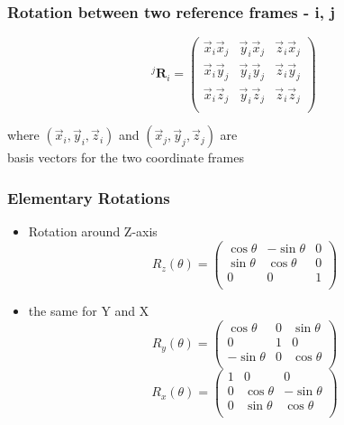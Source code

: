 \documentclass[10pt]{beamer}
\begin{document}
\begin{frame}
  \frametitle{Rotation between two reference frames - i, j}
  \[
    ^{j}\mathbf{R}_i = \left(
      \begin{array}{ccc}
        \vec{x}_i \vec{x}_j & \vec{y}_i \vec{x}_j & \vec{z}_i \vec{x}_j \\
        \vec{x}_i \vec{y}_j & \vec{y}_i \vec{y}_j & \vec{z}_i \vec{y}_j \\
        \vec{x}_i \vec{z}_j & \vec{y}_i \vec{z}_j & \vec{z}_i \vec{z}_j \\
      \end{array}
    \right)
  \]
  
  \vspace{1cm}
  \begin{center}
    where $(\vec{x}_i, \vec{y}_i, \vec{z}_i)$ and $(\vec{x}_j, \vec{y}_j, \vec{z}_j)$ are \\
    basis vectors for the two coordinate frames                          
    
  \end{center}
\end{frame}

\begin{frame}
  \frametitle{Elementary Rotations}
  \begin{itemize}
  \item Rotation around Z-axis
    \[
      R_z(\theta) = \left(
        \begin{array}{ccc}
          \cos \theta &  -\sin \theta & 0 \\
          \sin \theta &   \cos \theta & 0 \\
          0           &             0 & 1 \\
        \end{array}
      \right)
    \]
    \pause 
  \item the same for Y and X
    \[
      R_y(\theta) = \left(
        \begin{array}{ccc}
          \cos \theta  &  0 & \sin \theta  \\
          0             &  1 &   0 \\
          - \sin \theta &  0 &   \cos \theta  \\
        \end{array}
      \right)
    \]
    \[
      R_x(\theta) = \left(
        \begin{array}{ccc}
          1 &  0 &   0 \\
          0 & \cos \theta  &  - \sin \theta  \\
          0 & \sin \theta  &    \cos \theta  \\
        \end{array}
      \right)
    \]
  \end{itemize}
\end{frame}
\end{document}
